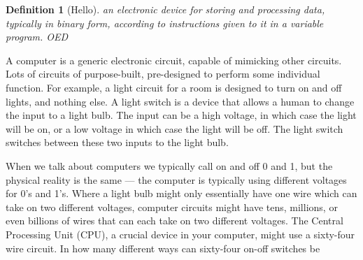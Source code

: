 \documentclass[9pt,a4paper,hidelinks,twocolumn]{article}
\title{\topicname}
\author{\contact}
\date{}
\newtheorem*{definition}{Definition}
\begin{document}
  
   \maketitle

    
 
 
  \begin{definition}[Hello] an electronic device for storing and processing data, typically in binary form, according to instructions given to it in a variable program. OED
  \end{definition}

  A computer is a generic electronic circuit, capable of mimicking other circuits.
  Lots of circuits of purpose-built, pre-designed to perform some individual function.
  For example, a light circuit for a room is designed to turn on and off lights, and nothing else.
  A light switch is a device that allows a human to change the input to a light bulb.
  The input can be a high voltage, in which case the light will be on, or a low voltage in which case the light will be off.
  The light switch switches between these two inputs to the light bulb.

  When we talk about computers we typically call on and off 0 and 1, but the physical reality is the same --- the computer is typically using different voltages for 0's and 1's.
  Where a light bulb might only essentially have one wire which can take on two different voltages, computer circuits might have tens, millions, or even billions of wires that can each take on two different voltages.
  The Central Processing Unit (CPU), a crucial device in your computer, might use a sixty-four wire circuit.
  In how many different ways can sixty-four on-off switches be 



  





  
\end{document}
